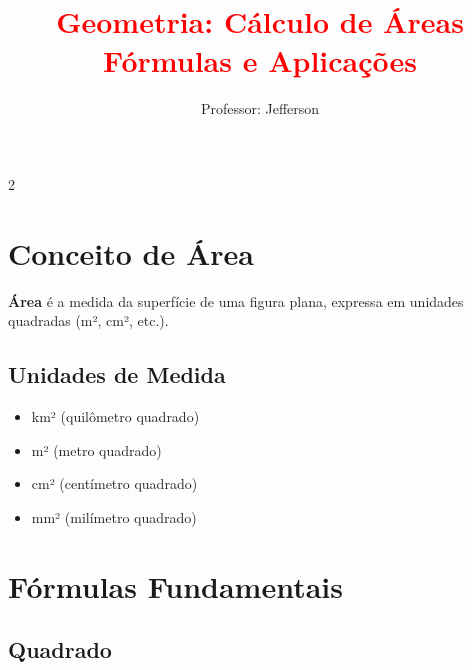 \documentclass[11pt]{article}
\title{\textcolor{red}{Geometria: Cálculo de Áreas
    \\Fórmulas e Aplicações}}
\author{Professor: Jefferson}
\date{}
\begin{document}
\maketitle
\vspace{-1cm}


\begin{multicols}{2}

\section*{Conceito de Área}

\textbf{Área} é a medida da superfície de uma figura plana, expressa em unidades quadradas (m², cm², etc.).

\subsection*{Unidades de Medida}
\begin{itemize}
\item km² (quilômetro quadrado)
\item m² (metro quadrado)
\item cm² (centímetro quadrado)
\item mm² (milímetro quadrado)
\end{itemize}

\section*{Fórmulas Fundamentais}

\subsection*{Quadrado}

\begin{center}
\end{center}



\end{multicols}
\end{document}
